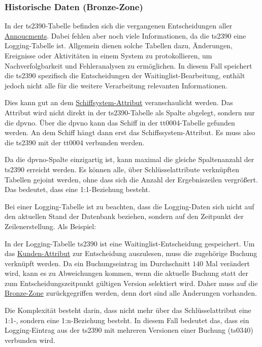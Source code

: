 \subsubsection{Historische Daten (Bronze-Zone)}
In der \gls{ts2390}-Tabelle befinden sich die vergangenen Entscheidungen aller \hyperref[ref:announcement]{Annoucments}. Dabei fehlen aber noch viele Informationen, da die \gls{ts2390} eine Logging-Tabelle ist.  
Allgemein dienen solche Tabellen dazu, Änderungen, Ereignisse oder Aktivitäten in einem System zu protokollieren, um Nachverfolgbarkeit und Fehleranalysen zu ermöglichen.  
In diesem Fall speichert die \gls{ts2390} spezifisch die Entscheidungen der Waitinglist-Bearbeitung, enthält jedoch nicht alle für die weitere Verarbeitung relevanten Informationen.

Dies kann gut an dem \hyperref[ref:attr_ssy]{Schiffsystem-Attribut} veranschaulicht werden. 
Das Attribut wird nicht direkt in der \gls{ts2390}-Tabelle als Spalte abgelegt, sondern nur die \gls{dpvno}. 
Über die \gls{dpvno} kann das Schiff in der \gls{tt0004}-Tabelle gefunden werden. 
An dem Schiff hängt dann erst das Schiffssystem-Attribut.
Es muss also die \gls{ts2390} mit der \gls{tt0004} verbunden werden. 

Da die \gls{dpvno}-Spalte einzigartig ist, kann maximal die gleiche Spaltenanzahl der \gls{ts2390} erreicht werden. Es können alle, über Schlüsselattribute verknüpften Tabellen gejoint werden, ohne dass sich die Anzahl der Ergebniszeilen vergrößert. Das bedeutet, dass eine 1:1-Beziehung besteht.

Bei einer Logging-Tabelle ist zu beachten, dass die Logging-Daten sich nicht auf den aktuellen Stand der Datenbank beziehen, sondern auf den Zeitpunkt der Zeilenerstellung. Als Beispiel: 

In der Logging-Tabelle \gls{ts2390} ist eine Waitinglist-Entscheidung gespeichert. 
Um das \hyperref[ref:attr_kunde]{Kunden-Attribut} zur Entscheidung auszulesen, muss die zugehörige Buchung verknüpft werden.  
Da ein Buchungseintrag im Durchschnitt $140$ Mal verändert wird, kann es zu Abweichungen kommen, wenn die aktuelle Buchung statt der zum Entscheidungszeitpunkt gültigen Version selektiert wird.
Daher muss auf die \hyperref[tab:zonenbsp]{Bronze-Zone} zurückgegriffen werden, denn dort sind alle Änderungen vorhanden.

Die Komplexität besteht darin, dass nicht mehr über das Schlüsselattribut eine 1:1-, sondern eine 1:n-Beziehung besteht. 
In diesem Fall bedeutet das, dass ein Logging-Eintrag aus der \gls{ts2390} mit mehreren Versionen einer Buchung (\gls{ts0340}) verbunden wird.

